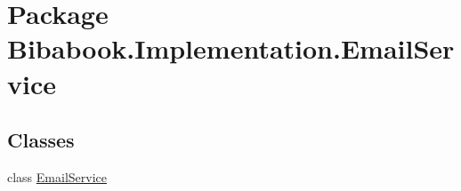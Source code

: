 \hypertarget{namespace_bibabook_1_1_implementation_1_1_email_service}{}\section{Package Bibabook.\+Implementation.\+Email\+Service}
\label{namespace_bibabook_1_1_implementation_1_1_email_service}
\subsection*{Classes}
\begin{DoxyCompactItemize}
\item 
class \hyperlink{class_bibabook_1_1_implementation_1_1_email_service_1_1_email_service}{Email\+Service}
\end{DoxyCompactItemize}
